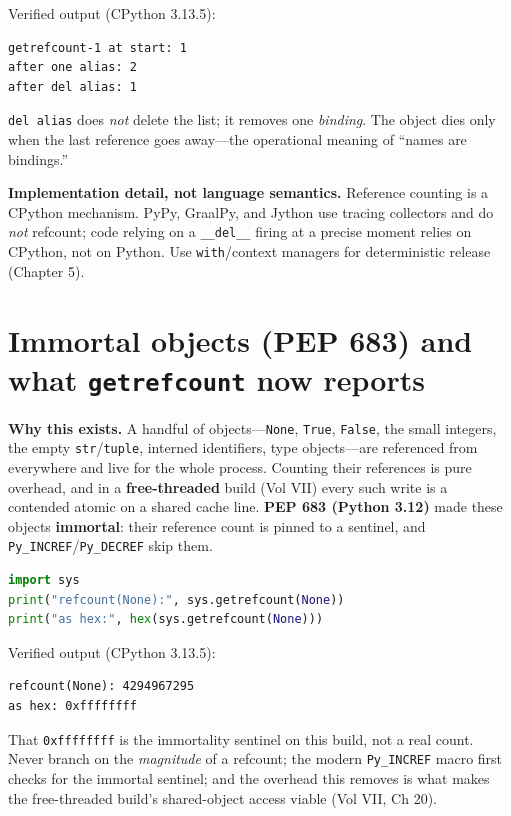 Verified output (CPython 3.13.5):

\begin{lstlisting}[caption={Output}]
getrefcount-1 at start: 1
after one alias: 2
after del alias: 1
\end{lstlisting}

\texttt{del alias} does \emph{not} delete the list; it removes one \emph{binding}. The object
dies only when the last reference goes away---the operational meaning of ``names are
bindings.''

\textbf{Implementation detail, not language semantics.} Reference counting is a CPython
mechanism. PyPy, GraalPy, and Jython use tracing collectors and do \emph{not} refcount; code
relying on a \texttt{\_\_del\_\_} firing at a precise moment relies on CPython, not on Python.
Use \texttt{with}/context managers for deterministic release (Chapter 5).

\section{Immortal objects (PEP 683) and what \texttt{getrefcount} now reports}

\textbf{Why this exists.} A handful of objects---\texttt{None}, \texttt{True},
\texttt{False}, the small integers, the empty \texttt{str}/\texttt{tuple}, interned
identifiers, type objects---are referenced from everywhere and live for the whole process.
Counting their references is pure overhead, and in a \textbf{free-threaded} build (Vol VII)
every such write is a contended atomic on a shared cache line. \textbf{PEP 683 (Python 3.12)}
made these objects \textbf{immortal}: their reference count is pinned to a sentinel, and
\texttt{Py\_INCREF}/\texttt{Py\_DECREF} skip them.

\begin{lstlisting}[language=Python, caption={Immortal objects (3.12+) report a pinned, enormous refcount that never changes.}]
import sys
print("refcount(None):", sys.getrefcount(None))
print("as hex:", hex(sys.getrefcount(None)))
\end{lstlisting}

Verified output (CPython 3.13.5):

\begin{lstlisting}[caption={Output}]
refcount(None): 4294967295
as hex: 0xffffffff
\end{lstlisting}

That \texttt{0xffffffff} is the immortality sentinel on this build, not a real count. Never
branch on the \emph{magnitude} of a refcount; the modern \texttt{Py\_INCREF} macro first
checks for the immortal sentinel; and the overhead this removes is what makes the
free-threaded build's shared-object access viable (Vol VII, Ch 20).


